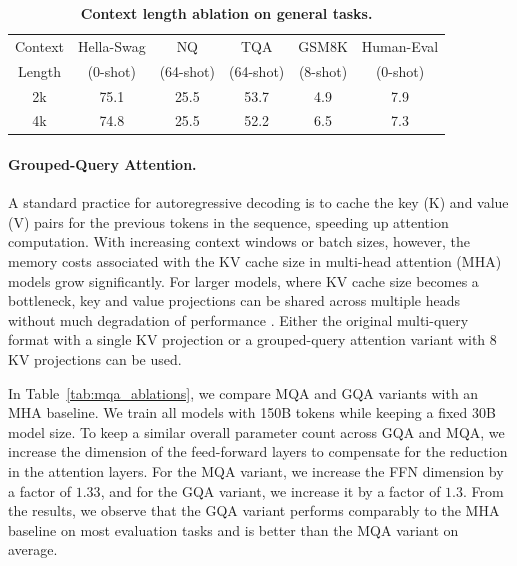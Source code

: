 \documentclass{article}
\begin{document}
\begin{table}[b!]
   \small
   \centering
   \setlength{\tabcolsep}{3pt}
   \begin{tabular}{cccccc}
   \toprule
   Context & Hella-\newline Swag & NQ & TQA & GSM8K & Human-\newline Eval \\
   Length & (0-shot) & (64-shot) & (64-shot) & (8-shot)  & (0-shot)  \\
   \midrule
   \midrule
   2k & 75.1 & 25.5 & 53.7 & 4.9 & 7.9 \\
   4k & 74.8 & 25.5 & 52.2 & 6.5 & 7.3 \\
   \bottomrule
   \end{tabular}
   \caption{
   \textbf{Context length ablation on general tasks.}
   \label{tab:long_context_ablations_gen}
   }
 \end{table}

\paragraph{Grouped-Query Attention.}
A standard practice for autoregressive decoding is to cache the key (K) and value (V) pairs for the previous tokens in the sequence, speeding up attention computation. With increasing context windows or batch sizes, however, the memory costs associated with the KV cache size in multi-head attention (MHA) models grow significantly. For larger models, where KV cache size becomes a bottleneck, key and value projections can be shared across multiple heads without much degradation of performance \citep{palm1}. Either the original multi-query format with a single KV projection \citep[MQA,~][]{shazeer2019mq} or a grouped-query attention variant with 8 KV projections \citep[GQA,~][]{gqa2023} can be used.

In Table~\ref{tab:mqa_ablations}, we compare MQA and GQA variants with an MHA baseline. We train all models with 150B tokens while keeping a fixed 30B model size. 
To keep a similar overall parameter count across GQA and MQA, we increase the dimension of the feed-forward layers to compensate for the reduction in the attention layers. For the MQA variant, we increase the FFN dimension by a factor of $1.33$, and for the GQA variant, we increase it by a factor of $1.3$. From the results, we observe that the GQA variant performs comparably to the MHA baseline on most evaluation tasks and is better than the MQA variant on average.
\end{document}

